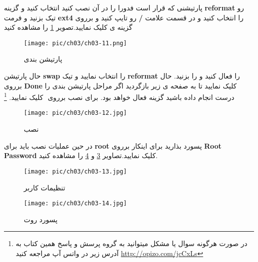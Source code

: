 پارتیشنی که قرار است فدورا را در آن نصب کنید انتخاب کنید و گزینه 
\textbf{reformat}
 رو تیک بزنید و فرمت 
 \textbf{ext4}
  را انتخاب کنید و در قسمت 
    علامت 
   \textbf{/}
    رو تایپ کنید و برروی گزینه ی 
     کلیک نمایید.تصویر
     \ref{pic-11}
     را مشاهده کنید
  \begin{figure}[H]%
 	\caption{پارتیشن بندی}
 	\begin{center}
 		\texttt{[image: pic/ch03/ch03-11.png]}
 	\end{center}
 	\label{pic-11}
 \end{figure}  
  حال پارتیشن 
  \textbf{swap}
   را انتخاب نمایید و تیک 
   \textbf{reformat}
   را فعال کنید و 
    را بزنید.
    حال برروی 
    \textbf{Done}
     کلیک نمایید تا به صفحه ی زیر بازگردید اگر مراحل پارتیشن بندی را درست انجام داده باشید گزینه  
      فعال خواهد بود. برای نصب برروی ‌
       کلیک نمایید.
       \footnote{در صورت هرگونه سوال یا مشکل میتوانید به گروه پرسش و پاسخ همین کتاب به آدرس زیر در واتس آپ مراجعه کنید
   \href{https://chat.whatsapp.com/6Z5uenUNLfr7lybFa5JU48}{http://opizo.com/jcCxLs}    
   }
 \begin{figure}[H]%
	\caption{نصب}
	\begin{center}
		\texttt{[image: pic/ch03/ch03-12.jpg]}
	\end{center}
	\label{pic-12}
\end{figure}  
در حین عملیات نصب باید برای 
\textbf{root}
 پسورد بذارید برای اینکار برروی 
 \textbf{Root Password }%
 کلیک نمایید.تصاویر
 \ref{pic-13}
 و
 \ref{pic-14}
 را مشاهده کنید. 
  \begin{figure}[H]%
 	\caption{تنظیمات کاربر}
 	\begin{center}
 		\texttt{[image: pic/ch03/ch03-13.jpg]}
 	\end{center}
 	\label{pic-13}
 \end{figure}   
\begin{figure}[H]%
	\caption{پسورد روت}
	\begin{center}
		\texttt{[image: pic/ch03/ch03-14.jpg]}
	\end{center}
	\label{pic-14}
\end{figure}    

